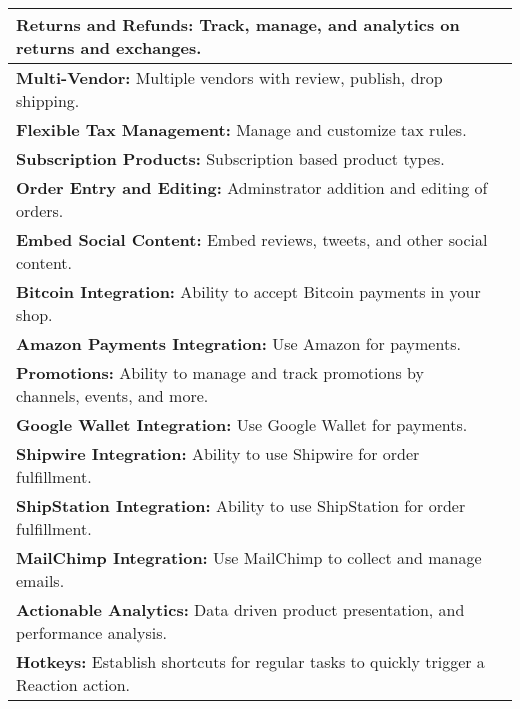 \begin{table}[h!]
\begin{tabular}{ |L{0.6\paperwidth}|L{0.1\paperwidth}|}
\\ \hline
	\textbf{ Returns and Refunds:} Track, manage, and analytics on returns and exchanges.&
	
\\ \hline
	\textbf{ Multi-Vendor:} Multiple vendors with review, publish, drop shipping.&
	
\\ \hline
	\textbf{ Flexible Tax Management:} Manage and customize tax rules.&
	
\\ \hline
	\textbf{ Subscription Products:} Subscription based product types.&
	
\\ \hline
	\textbf{ Order Entry and Editing:} Adminstrator addition and editing of orders.&
	
\\ \hline
	\textbf{ Embed Social Content:} Embed reviews, tweets, and other social content.&
	
\\ \hline
	\textbf{ Bitcoin Integration:} Ability to accept Bitcoin payments in your shop.&
	
\\ \hline
	\textbf{ Amazon Payments Integration:} Use Amazon for payments.&
	
\\ \hline
	\textbf{ Promotions:} Ability to manage and track promotions by channels, events, and more.&
	
\\ \hline
	\textbf{ Google Wallet Integration:} Use Google Wallet for payments.&
	
\\ \hline
	\textbf{ Shipwire Integration:} Ability to use Shipwire for order fulfillment.&
	
\\ \hline
	\textbf{ ShipStation Integration:} Ability to use ShipStation for order fulfillment.&
	
\\ \hline
	\textbf{ MailChimp Integration:} Use MailChimp to collect and manage emails.&
	
\\ \hline
	\textbf{ Actionable Analytics:} Data driven product presentation, and performance analysis.&
	
\\ \hline
	\textbf{ Hotkeys:} Establish shortcuts for regular tasks to quickly trigger a Reaction action.&
	

\end{tabular}
\end{table}
